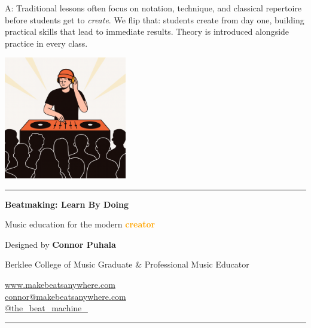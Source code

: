 \documentclass[11pt,letterpaper]{article}
\newcommand{\orangetext}[1]{\textcolor{orange}{\textbf{#1}}}
\begin{document}
A: Traditional lessons often focus on notation, technique, and classical repertoire before students get to \textit{create}. We flip that: students create from day one, building practical skills that lead to immediate results. Theory is introduced alongside practice in every class.

\vspace{1cm}

\begin{center}
\includegraphics[width=0.4\textwidth]{Illustrations/DJShow.png}
\end{center}

\vspace{0.5cm}

\begin{center}
\rule{0.8\textwidth}{0.5pt}

\vspace{0.5cm}

\Large\textbf{Beatmaking: Learn By Doing}

\vspace{0.3cm}

\normalsize Music education for the modern \orangetext{creator}

\vspace{0.5cm}

\small Designed by \textbf{Connor Puhala}

\small Berklee College of Music Graduate \& Professional Music Educator

\vspace{0.8cm}

\normalsize
\href{https://www.makebeatsanywhere.com/}{www.makebeatsanywhere.com} \\[0.2cm]
\href{mailto:connor@makebeatsanywhere.com}{connor@makebeatsanywhere.com} \\[0.2cm]
\href{https://www.instagram.com/the_beat_machine_}{@the\_beat\_machine\_}

\vspace{0.5cm}

\rule{0.8\textwidth}{0.5pt}
\end{center}
\end{document}
